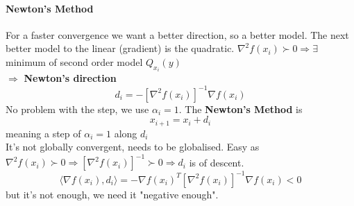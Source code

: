 \documentclass[10pt]{report}
\begin{document}
\paragraph{Newton's Method} For a faster convergence we want a better direction, so a better model. The next better model to the linear (gradient) is the quadratic. $\nabla^2 f(x_i)\succ 0 \Rightarrow \exists$ minimum of second order model $Q_{x_i}(y)$\\$\Rightarrow$ \textbf{Newton's direction} $$d_i = -[\nabla^2 f(x_i)]^{-1}\nabla f(x_i)$$ No problem with the step, we use $\alpha_i = 1$. The \textbf{Newton's Method} is $$x_{i+1} = x_i + d_i$$ meaning a step of $\alpha_i = 1$ along $d_i$\\
It's not globally convergent, needs to be globalised. Easy as $\nabla^2 f(x_i) \succ 0 \Rightarrow [\nabla^2 f(x_i)]^{-1} \succ 0 \Rightarrow d_i$ is of descent.
$$\langle \nabla f(x_i), d_i\rangle = -\nabla f(x_i)^T[\nabla^2f(x_i)]^{-1}\nabla f(x_i) < 0$$
but it's not enough, we need it "negative enough".
\end{document}
